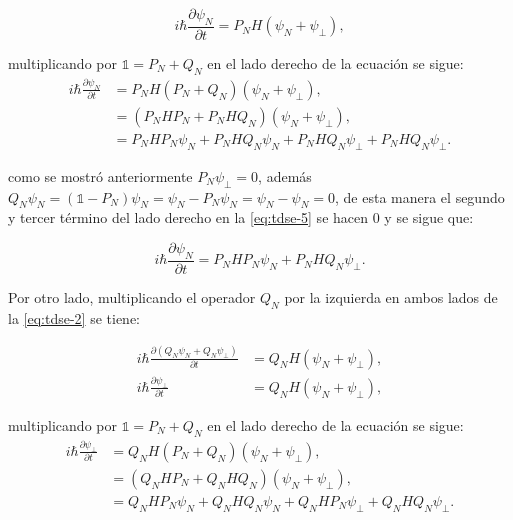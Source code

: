 \begin{equation}
   \label{eq:tdse-4}
  i\hbar\frac{\partial \psi_N}{\partial t} = P_NH (\psi_N + \psi_{\perp}),
\end{equation}

multiplicando por $\mathbb{1}=P_N + Q_N$ en el lado derecho de la ecuación se sigue:
\begin{align}
  \label{eq:tdse-5}
 i\hbar\frac{\partial \psi_N}{\partial t}&= P_NH(P_N + Q_N) (\psi_N + \psi_{\perp}), \nonumber  \\ 
                                         &= (P_NHP_N + P_NHQ_N)(\psi_N + \psi_{\perp}), \nonumber \\
  &= P_NHP_N\psi_N + P_NHQ_N\psi_N + P_NHQ_N\psi_{\perp} + P_NHQ_N\psi_{\perp}.
\end{align}

\noindent como se mostró anteriormente $P_N\psi_{\perp}=0$, además $Q_N \psi_N = (\mathbb{1}-P_N)\psi_N = \psi_N - P_N\psi_N = \psi_N - \psi_N = 0$, de esta manera el segundo y tercer término del lado derecho en la \autoref{eq:tdse-5} se hacen $0$ y se sigue que:

\begin{equation}
  \label{eq:tdse-p1}
  i\hbar\frac{\partial \psi_N}{\partial t} = P_NHP_N\psi_N  + P_NHQ_N\psi_{\perp}.
\end{equation}

Por otro lado, multiplicando el operador $Q_N$ por la izquierda en ambos lados de la \autoref{eq:tdse-2} se tiene:

\begin{align}
   \label{eq:tdse-6}
  i\hbar\frac{\partial (Q_N \psi_N + Q_N \psi_{\perp})}{\partial t} &= Q_NH (\psi_N + \psi_{\perp}), \nonumber \\
  i\hbar\frac{\partial \psi_{\perp}}{\partial t} &= Q_NH (\psi_N + \psi_{\perp}),
\end{align}

\noindent multiplicando por $\mathbb{1}=P_N + Q_N$ en el lado derecho de la ecuación se sigue:
\begin{align}
  \label{eq:tdse-7}
  i\hbar\frac{\partial \psi_{\perp}}{\partial t}&= Q_NH(P_N + Q_N) (\psi_N + \psi_{\perp}), \nonumber  \\ 
                                         &= (Q_NHP_N + Q_NHQ_N)(\psi_N + \psi_{\perp}), \nonumber \\
                                          &= Q_NHP_N\psi_N + Q_NHQ_N\psi_N + Q_NHP_N\psi_{\perp} + Q_NHQ_N\psi_{\perp}.
\end{align}

